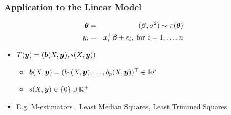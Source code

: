 \documentclass{beamer}
\def\bth{\mbox{\boldmath $\theta$}}
\def\bbeta{\mbox{\boldmath $\beta$}}
\newcommand{\by}{\mbox{\boldmath $y$}}
\newcommand{\bb}{\mbox{\boldmath $b$}}
\begin{document}
%
%


\begin{frame}
\frametitle{Application to the Linear Model}
\begin{eqnarray*}
	\label{LinearModel}
	\bth&=&(\bbeta,\sigma^2) \sim  \pi(\bth) 
	\nonumber\\
	y_i  & =  & x_i^\top \bbeta + \epsilon_i , \mbox{ for } i = 1, \ldots, n 
\end{eqnarray*}

\begin{itemize}
	\item $T(\by) = (\bb(X, \by), s(X, \by))$ 
\begin{itemize}
	\item $\bb(X, \by)= (b_1(X,\by), \dots,b_p(X,\by))^\top\in \mathbb R^{p}$ 
	\item $s(X, \by)\in \{0\} \cup {\mathbb R}^+$
\end{itemize}
	\item E.g. M-estimators \cite{huber1964}, Least Median Squares, Least Trimmed Squares 
\end{itemize}


\end{frame}
\end{document}
